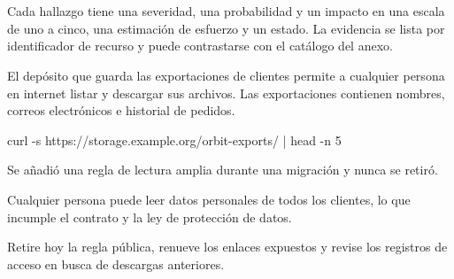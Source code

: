 \section{\lblFindings}
Cada hallazgo tiene una severidad, una probabilidad y un impacto en una escala
de uno a cinco, una estimación de esfuerzo y un estado. La evidencia se lista
por identificador de recurso y puede contrastarse con el catálogo del anexo.

\begin{finding}[id=F-01,title={Las exportaciones de clientes son de lectura pública},
    severity=critical,likelihood=5,impact=5,effort=small,status=open]
  \findingpart{\lblDescription}
  El depósito que guarda las exportaciones de clientes permite a cualquier
  persona en internet listar y descargar sus archivos. Las exportaciones
  contienen nombres, correos electrónicos e historial de pedidos.

  \findingpart{\lblReproduction}
  \begin{code}[lang=bash]
curl -s https://storage.example.org/orbit-exports/ | head -n 5
  \end{code}

  \findingpart{\lblRootCause}
  Se añadió una regla de lectura amplia durante una migración y nunca se retiró.

  \findingpart{\lblImpact}
  Cualquier persona puede leer datos personales de todos los clientes, lo que
  incumple el contrato y la ley de protección de datos.

  \findingpart{\lblRecommendation}
  Retire hoy la regla pública, renueve los enlaces expuestos y revise los
  registros de acceso en busca de descargas anteriores.

  \findingpart{\lblEvidence}
  \begin{evidence}
  \end{evidence}
\end{finding}

